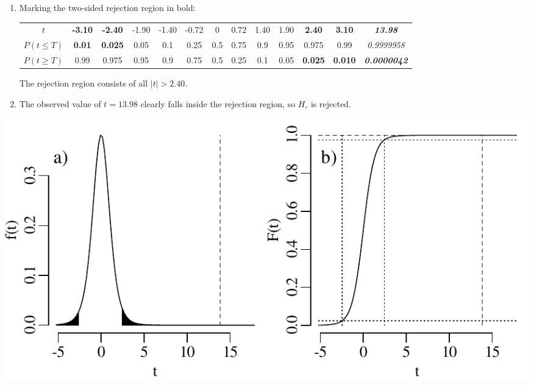 \begin{enumerate}
\item Marking the two-sided rejection region in bold:
  
  \begin{center}
    \begin{tabular}{c|c@{\gap}c@{\gap}c@{\gap}c@{\gap}
        c@{\gap}c@{\gap}c@{\gap}c@{\gap}c@{\gap}c@{\gap}c@{\gap}c}
      $t$ & \textbf{-3.10} & \textbf{-2.40} & -1.90 & -1.40 & -0.72 &
      0 & 0.72 & 1.40 & 1.90 & \textbf{2.40} &
      \textbf{3.10} & \textbf{\emph{13.98}}\\
      $P(t\leq{T})$ & \textbf{0.01} & \textbf{0.025} & 0.05 & 0.1 & 0.25 &
      0.5 & 0.75 & 0.9 & 0.95 & 0.975 & 0.99 & \emph{0.9999958}\\
      $P(t\geq{T})$ & 0.99 & 0.975 & 0.95 & 0.9 & 0.75 & 0.5 &
      0.25 & 0.1 & 0.05 & \textbf{0.025} & \textbf{0.010} &
      \textbf{\emph{0.0000042}}
    \end{tabular}
  \end{center}

  The rejection region consists of all $|t|>{2.40}$.

\item The observed value of $t=13.98$ clearly falls inside the
  rejection region, so $H_\circ$ is rejected.
  
\end{enumerate}

\noindent\begin{minipage}[t][][b]{.6\textwidth}
  \includegraphics[width=\textwidth]{../figures/tr.pdf}\\
\end{minipage}
\begin{minipage}[t][][t]{.4\textwidth}
  \label{fig:tr}
\end{minipage}

